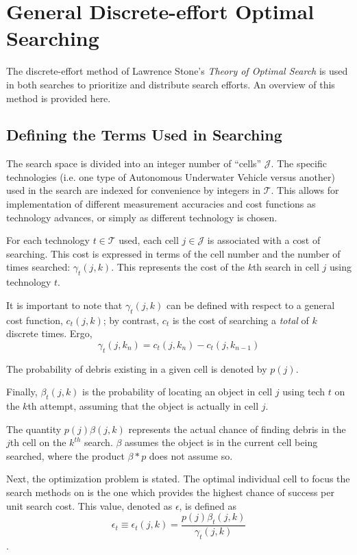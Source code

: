 \documentclass[a4paper]{article}
\begin{document}
\section{General Discrete-effort Optimal Searching}

The discrete-effort method of Lawrence Stone's \textit{Theory of Optimal Search} is used in both searches to prioritize and distribute search efforts. An overview of this method is provided here. 

\subsection{Defining the Terms Used in Searching}

The search space is divided into an integer number of ``cells'' $\mathcal{J}$. The specific technologies (i.e. one type of Autonomous Underwater Vehicle versus another) used in the search are indexed for convenience by integers in $\mathcal{T}$. This allows for implementation of different measurement accuracies and cost functions as technology advances, or simply as different technology is chosen. 

For each technology $t\in\mathcal{T}$ used, each cell $j\in\mathcal{J}$ is associated with a cost of searching. This cost is expressed in terms of the cell number and the number of times searched: $\gamma_t(j,k)$. This represents the cost of the $k$th search in cell $j$ using technology $t$.

It is important to note that $\gamma_t(j,k)$ can be defined with respect to a general cost function, $c_t(j,k)$; by contrast, $c_t$ is the cost of searching  a \textit{total} of $k$ discrete times. Ergo, $$\gamma_t(j,k_n)=c_t(j,k_n)-c_t(j,k_{n-1})$$

The probability of debris existing in a given cell is denoted by $p(j)$.

Finally, $\beta_t(j,k)$ is the probability of locating an object in cell $j$ using tech $t$ on the $k$th attempt, assuming that the object is actually in cell $j$.

The quantity $p(j)\beta(j,k)$ represents the actual chance of finding debris in the $j$th cell on the $k^{th}$ search. $\beta$ assumes the object is in the current cell being searched, where the product $\beta * p$ does not assume so.

Next, the optimization problem is stated. The optimal individual cell to focus the search methods on is the one which provides the highest chance of success per unit search cost. This value, denoted as $\epsilon$, is defined as $$\epsilon_t\equiv\epsilon_t(j,k)=\frac{p(j)\beta_t(j,k)}{\gamma_t(j,k)}$$. 
\end{document}
